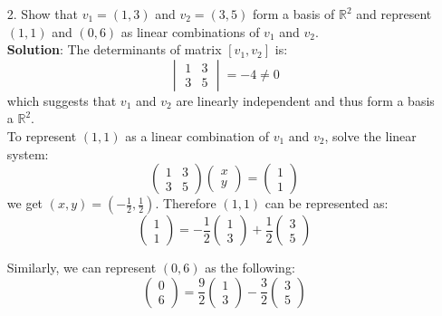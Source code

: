 \documentclass{article}
\begin{document}
\begin{enumerate}
    \item[2. ] Show that $v_1 = (1,3)$ and $v_2 = (3,5)$ form a basis of $\mathbb{R}^2$ and represent $(1,1)$ and $(0,6)$ as linear combinations of $v_1$ and $v_2$. \\
    
    \textbf{Solution}: The determinants of matrix $[v_1, v_2]$ is:
    $$ \begin{vmatrix}1 &3\\3 &5\end{vmatrix} = -4 \neq 0 $$
    which suggests that $v_1$ and $v_2$ are linearly independent and thus form a basis a $\mathbb{R}^2$.\\
    
    To represent $(1,1)$ as a linear combination of $v_1$ and $v_2$, solve the linear system:
    $$\begin{pmatrix}1 &3\\3 &5\end{pmatrix}\begin{pmatrix}x\\y\end{pmatrix}=\begin{pmatrix}1\\1\end{pmatrix}$$
    we get $(x,y) = (-\frac{1}{2}, \frac{1}{2})$. Therefore $(1,1)$ can be represented as:
    $$ \begin{pmatrix}1\\1\end{pmatrix} = -\frac{1}{2}\begin{pmatrix}1\\3\end{pmatrix} + \frac{1}{2}\begin{pmatrix}3\\5\end{pmatrix} $$
    
    Similarly, we can represent $(0,6)$ as the following:
    $$ \begin{pmatrix}0\\6\end{pmatrix} = \frac{9}{2}\begin{pmatrix}1\\3\end{pmatrix} - \frac{3}{2}\begin{pmatrix}3\\5\end{pmatrix} $$
    

\end{enumerate}
\end{document}

